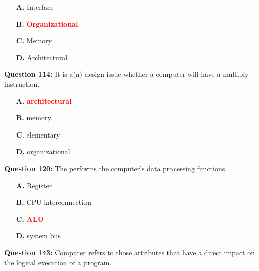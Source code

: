 \documentclass[12pt,a4paper]{article}
\begin{document}
\begin{itemize}
    \item[\textbf{A.}] Interface
    \item[\textbf{B.}] \textcolor{red}{\textbf{Organizational}}
    \item[\textbf{C.}] Memory
    \item[\textbf{D.}] Architectural
\end{itemize}

\vspace{0.5cm}

\vspace{0.5cm}

\textbf{Question 114:} It is a(n) \underline{\hspace{1.5cm}} design issue whether a computer will have a multiply instruction.

\begin{itemize}
    \item[\textbf{A.}] \textcolor{red}{\textbf{architectural}}
    \item[\textbf{B.}] memory
    \item[\textbf{C.}] elementary
    \item[\textbf{D.}] organizational
\end{itemize}

\vspace{0.5cm}

\vspace{0.5cm}

\textbf{Question 120:} The \underline{\hspace{1.5cm}} performs the computer's data processing functions.

\begin{itemize}
    \item[\textbf{A.}] Register
    \item[\textbf{B.}] CPU interconnection
    \item[\textbf{C.}] \textcolor{red}{\textbf{ALU}}
    \item[\textbf{D.}] system bus
\end{itemize}

\vspace{0.5cm}

\vspace{0.5cm}

\textbf{Question 143:} Computer \underline{\hspace{1.5cm}} refers to those attributes that have a direct impact on the logical execution of a program.
\end{document}
